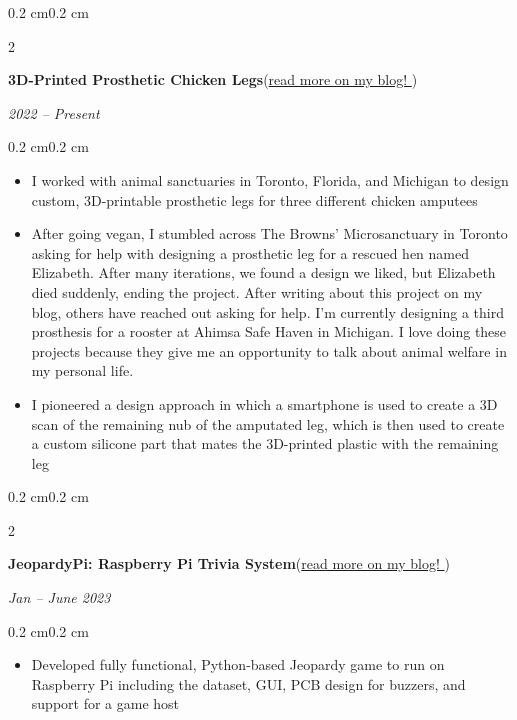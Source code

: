 \documentclass[10pt, letterpaper]{article}
\newenvironment{highlights}{
    \begin{itemize}[topsep=0.10 cm,parsep=0.10 cm,partopsep=0pt,itemsep=0pt,leftmargin=0.4 cm + 10pt]
}{
    \end{itemize}
}
\newenvironment{onecolentry}{
    \begin{adjustwidth}{0.2 cm}{0.2 cm}
}{
    \end{adjustwidth}
}
\newenvironment{twocolentry}[2][]{
    \onecolentry
    \def\secondColumn{#2}
    \setcolumnwidth{\fill, 4.5 cm}
    \begin{paracol}{2}
}{
    \switchcolumn \raggedleft \secondColumn
    \end{paracol}
    \endonecolentry
}
\let\hrefWithoutArrow\href
\renewcommand{\href}[2]{\hrefWithoutArrow{#1}{#2 \raisebox{.15ex}{\footnotesize \faExternalLink*}}}
\begin{document}
        \begin{twocolentry}{\textit{2022 – Present}}
            \textbf{3D-Printed Prosthetic Chicken Legs}(\href{https://elijahparker000.com/projects/Prosthetic-Chicken-Leg-Mk-2-Una/}{read more on my blog!})
        \end{twocolentry}
        \vspace{0.10 cm}
        \begin{onecolentry}
            \begin{highlights}
                \item I worked with animal sanctuaries in Toronto, Florida, and Michigan to design custom, 3D-printable prosthetic legs for three different chicken amputees
                \item After going vegan, I stumbled across The Browns' Microsanctuary in Toronto asking for help with designing a prosthetic leg for a 
                rescued hen named Elizabeth. After many iterations, we found a design we liked, but Elizabeth died suddenly, ending the project. After 
                writing about this project on my blog, others have reached out asking for help. I'm currently designing a third prosthesis for a 
                rooster at Ahimsa Safe Haven in Michigan. I love doing these projects because they give me an opportunity to talk about animal welfare
                in my personal life. 
                \item I pioneered a design approach in which a smartphone is used to create a 3D scan of the remaining nub of the amputated leg, which is then used to create a custom silicone part that mates the 3D-printed plastic with the remaining leg
            \end{highlights}
        \end{onecolentry}

        \vspace{0.2 cm}

        \begin{twocolentry}{\textit{Jan – June 2023}}
            \textbf{JeopardyPi: Raspberry Pi Trivia System}(\href{https://elijahparker000.com/projects/JeopardyPi/}{read more on my blog!})
        \end{twocolentry}
        \vspace{0.10 cm}
        \begin{onecolentry}
            \begin{highlights}
                \item Developed fully functional, Python-based Jeopardy game to run on Raspberry Pi including the dataset, GUI, PCB design for buzzers, and support for a game host 
            \end{highlights}
        \end{onecolentry}
\end{document}
